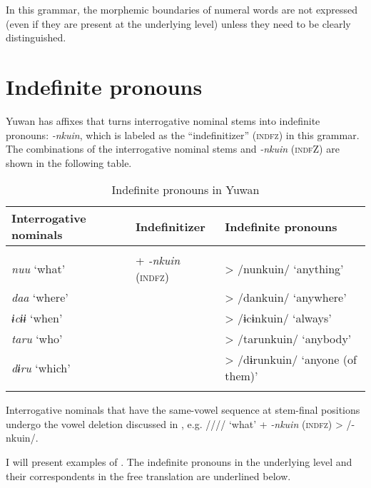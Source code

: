 In this grammar, the morphemic boundaries of numeral words are not expressed (even if they are present at the underlying level) unless they need to be clearly distinguished.

\section{Indefinite pronouns}

Yuwan has affixes that turns interrogative nominal stems into indefinite pronouns: \textit{{}-nkuin}, which is labeled as the “indefinitizer” (\textsc{indfz}) in this grammar. The combinations of the interrogative nominal stems and \textit{-nkuin} (\textsc{indf}Z) are shown in the following table.

\begin{table}
\caption{\label{tab:key:54} Indefinite pronouns in Yuwan}
\begin{tabular}{lll}
Interrogative nominals  &   Indefinitizer    & Indefinite pronouns\\
\midrule                                                                                                \\
\textit{nuu}  ‘what’   & +  \textit{{}-nkuin} (\textsc{indfz})&  >  /nunkuin/  ‘anything’               \\
\textit{daa}  ‘where’  &                                      &  >  /dankuin/  ‘anywhere’               \\
\textit{ɨcɨɨ}  ‘when’  &                                      &  >  /ɨcɨnkuin/  ‘always’                \\
\textit{taru}  ‘who’   &                                      & >  /tarunkuin/  ‘anybody’               \\
\textit{dɨru}  ‘which’ &                                      &   >  /dɨrunkuin/  ‘anyone (of them)’    \\
\lspbottomrule
\end{tabular}
\end{table}

Interrogative nominals that have the same-vowel sequence at stem-final positions undergo the vowel deletion discussed in , e.g. //// ‘what’ + \textit{{}-nkuin} (\textsc{indfz}) > /-nkuin/.

  I will present examples of . The indefinite pronouns in the underlying level and their correspondents in the free translation are underlined below.

